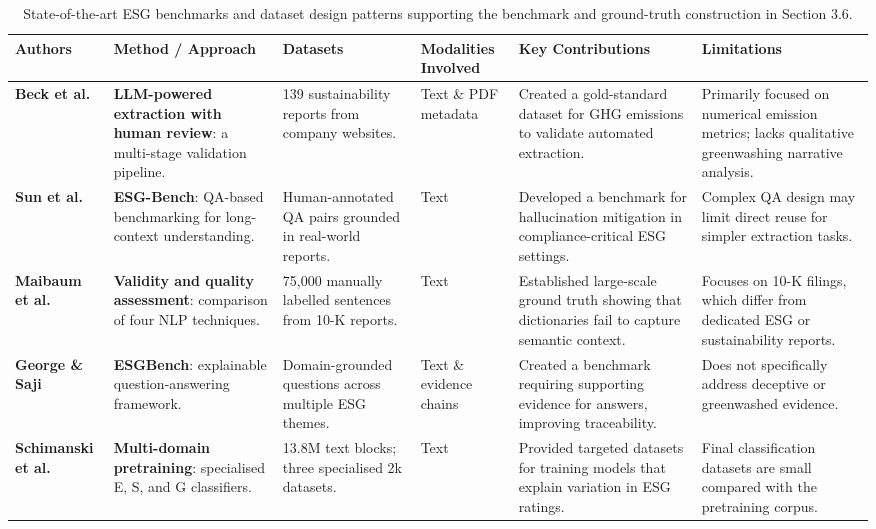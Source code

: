 \documentclass[english, online, cse, master]{dithesis}
\begin{document}
\begin{landscape}
\begin{table}[p]
\centering
\caption{State-of-the-art ESG benchmarks and dataset design patterns supporting the benchmark and ground-truth construction in Section 3.6.}
\label{tab:esg-benchmark-dataset-design}
\small
\renewcommand{\arraystretch}{1.2}
\begin{tabularx}{\linewidth}{|p{1.8cm}|X|X|p{1.8cm}|X|X|}
\hline
Authors & Method / Approach & Datasets & Modalities Involved & Key Contributions & Limitations \\ \hline
\textbf{Beck et al.} \parencite{jacob_beck_9548a833} & \textbf{LLM-powered extraction with human review}: a multi-stage validation pipeline. & 139 sustainability reports from company websites. & Text \& PDF metadata & Created a gold-standard dataset for GHG emissions to validate automated extraction. & Primarily focused on numerical emission metrics; lacks qualitative greenwashing narrative analysis. \\ \hline
\textbf{Sun et al.} \parencite{siqi_sun_f6a51152} & \textbf{ESG-Bench}: QA-based benchmarking for long-context understanding. & Human-annotated QA pairs grounded in real-world reports. & Text & Developed a benchmark for hallucination mitigation in compliance-critical ESG settings. & Complex QA design may limit direct reuse for simpler extraction tasks. \\ \hline
\textbf{Maibaum et al.} \parencite{frederik_maibaum_b8629037} & \textbf{Validity and quality assessment}: comparison of four NLP techniques. & 75,000 manually labelled sentences from 10-K reports. & Text & Established large-scale ground truth showing that dictionaries fail to capture semantic context. & Focuses on 10-K filings, which differ from dedicated ESG or sustainability reports. \\ \hline
\textbf{George \& Saji} \parencite{s_s__george_b30d4b3e} & \textbf{ESGBench}: explainable question-answering framework. & Domain-grounded questions across multiple ESG themes. & Text \& evidence chains & Created a benchmark requiring supporting evidence for answers, improving traceability. & Does not specifically address deceptive or greenwashed evidence. \\ \hline
\textbf{Schimanski et al.} \parencite{tobias_schimanski_4e192ec5} & \textbf{Multi-domain pretraining}: specialised E, S, and G classifiers. & 13.8M text blocks; three specialised 2k datasets. & Text & Provided targeted datasets for training models that explain variation in ESG ratings. & Final classification datasets are small compared with the pretraining corpus. \\ \hline

\end{tabularx}
\end{table}
\end{landscape}
\end{document}
